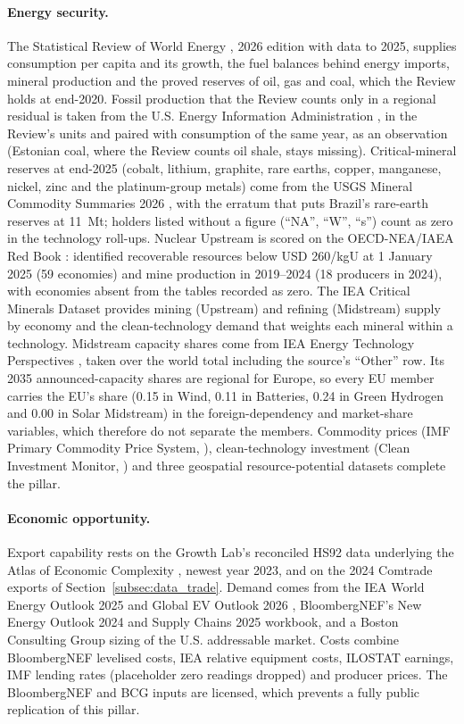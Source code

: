 \paragraph{Energy security.} The Statistical Review of World Energy \citep{ei2026statistical},
2026 edition with data to 2025, supplies consumption per capita and its growth, the fuel balances
behind energy imports, mineral production and the proved reserves of oil, gas and coal, which the
Review holds at end-2020. Fossil production that the Review counts only in a regional residual
is taken from the U.S. Energy Information Administration \citep{eia2026international}, in the
Review's units and paired with consumption of the same year, as an observation (Estonian coal,
where the Review counts oil shale, stays missing). Critical-mineral reserves at end-2025 (cobalt,
lithium, graphite, rare earths, copper, manganese, nickel, zinc and the platinum-group metals)
come from the USGS Mineral Commodity Summaries 2026 \citep{usgs2026mcs}, with the erratum that
puts Brazil's rare-earth reserves at 11~Mt; holders listed without a figure (``NA'', ``W'',
``s'') count as zero in the technology roll-ups. Nuclear Upstream is scored on the OECD-NEA/IAEA
Red Book \citep{oecdnea2026uranium}: identified recoverable resources below USD 260/kgU at
1 January 2025 (59 economies) and mine production in 2019--2024 (18 producers in 2024), with
economies absent from the tables recorded as zero. The IEA Critical Minerals Dataset
\citep{iea2026cmdata} provides mining (Upstream) and refining (Midstream) supply by economy and
the clean-technology demand that weights each mineral within a technology. Midstream capacity
shares come from IEA Energy Technology Perspectives \citep{iea2024etp}, taken over the world total
including the source's ``Other'' row. Its 2035 announced-capacity shares are regional for
Europe, so every EU member carries the EU's share (0.15 in Wind, 0.11 in Batteries, 0.24 in Green
Hydrogen and 0.00 in Solar Midstream) in the foreign-dependency and market-share variables, which
therefore do not separate the members. Commodity prices (IMF Primary Commodity Price System, \citealp{imf2026pcps}),
clean-technology investment (Clean Investment Monitor, \citealp{cim2026}) and three geospatial
resource-potential datasets complete the pillar.

\paragraph{Economic opportunity.} Export capability rests on the Growth Lab's reconciled HS92 data
underlying the Atlas of Economic Complexity \citep{growthlab2019trade,hausmann2014atlas}, newest
year 2023, and on the 2024 Comtrade exports of Section~\ref{subsec:data_trade}. Demand comes from
the IEA World Energy Outlook 2025 and Global EV Outlook 2026 \citep{iea2025weo,iea2026gevo},
BloombergNEF's New Energy Outlook 2024 \citep{bnef2024neo} and Supply Chains 2025 workbook, and a
Boston Consulting Group sizing of the U.S. addressable market. Costs combine BloombergNEF levelised
costs, IEA relative equipment costs, ILOSTAT earnings, IMF lending rates (placeholder zero
readings dropped) and producer prices. The BloombergNEF and BCG inputs are licensed, which
prevents a fully public replication of this pillar.

